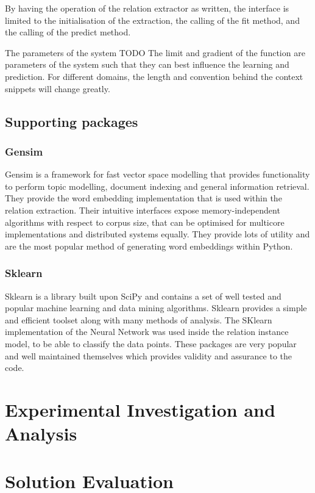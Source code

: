 \documentclass[11pt]{article} %
\begin{document}
By having the operation of the relation extractor as written, the interface is limited to the initialisation of the extraction, the calling of the fit method, and the calling of the predict method.

The parameters of the system
TODO
The limit and gradient of the function are parameters of the system such that they can best influence the learning and prediction. For different domains, the length and convention behind the context snippets will change greatly.

\subsection{Supporting packages}

\subsubsection{Gensim}
Gensim is a framework for fast vector space modelling that provides functionality to perform topic modelling, document indexing and general information retrieval. They provide the word embedding implementation that is used within the relation extraction. Their intuitive interfaces expose memory-independent algorithms with respect to corpus size, that can be optimised for multicore implementations and distributed systems equally. They provide lots of utility and are the most popular method of generating word embeddings within Python.

\subsubsection{Sklearn}
Sklearn is a library built upon SciPy and contains a set of well tested and popular machine learning and data mining algorithms. Sklearn provides a simple and efficient toolset along with many methods of analysis. The SKlearn implementation of the Neural Network was used inside the relation instance model, to be able to classify the data points. These packages are very popular and well maintained themselves which provides validity and assurance to the code.

\section{Experimental Investigation and Analysis}

\section{Solution Evaluation}
\end{document}

